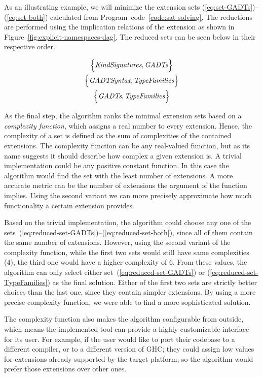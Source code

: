\documentclass[main.tex]{subfiles}
\begin{document}
	As an illustrating example, we will minimize the extension sets (\ref{eq:set-GADTs})--(\ref{eq:set-both}) calculated from Program~code~\ref{code:sat-solving}. The reductions are performed using the implication relations of the extension as shown in Figure~\ref{fig:explicit-namespaces-dag}. The reduced sets can be seen below in their respective order.
	
	\begin{gather}
		\Big\{ \textit{KindSignatures}, \textit{GADTs} \Big\} \label{eq:reduced-set-GADTs} \\
		\Big\{ \textit{GADTSyntax}, \textit{TypeFamilies} \Big\} \label{eq:reduced-set-TypeFamilies} \\
		\Big\{ \textit{GADTs}, \textit{TypeFamilies} \Big\} \label{eq:reduced-set-both}
	\end{gather}
	
	As the final step, the algorithm ranks the minimal extension sets based on a \emph{complexity function}, which assigns a real number to every extension. Hence, the complexity of a set is defined as the sum of complexities of the contained extensions. The complexity function can be any real-valued function, but as its name suggests it should describe how complex a given extension is. A trivial implementation could be any positive constant function. In this case the algorithm would find the set with the least number of extensions. A more accurate metric can be the number of extensions the argument of the function implies. Using the second variant we can more precisely approximate how much functionality a certain extension provides.
	
	Based on the trivial implementation, the algorithm could choose any one of the sets~(\ref{eq:reduced-set-GADTs})--(\ref{eq:reduced-set-both}), since all of them contain the same number of extensions. However, using the second variant of the complexity function, while the first two sets would still have same complexities (4), the third one would have a higher complexity of 6. From these values, the algorithm can only select either set~(\ref{eq:reduced-set-GADTs}) or (\ref{eq:reduced-set-TypeFamilies}) as the final solution. Either of the first two sets are strictly better choices than the last one, since they contain simpler extensions. By using a more precise complexity function, we were able to find a more sophisticated solution.
	
	The complexity function also makes the algorithm configurable from outside, which means the implemented tool can provide a highly customizable interface for its user. For example, if the user would like to port their codebase to a different compiler, or to a different version of GHC; they could assign low values for extensions already supported by the target platform, so the algorithm would prefer those extensions over other ones.
		
\end{document}
